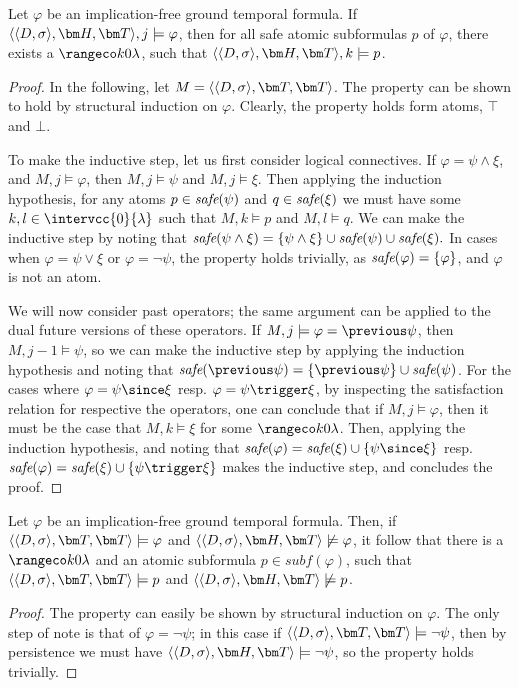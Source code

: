 \begin{lemma}\label{lemma:safe-atomic-subformula-satisfied}
  Let $\varphi$ be an implication-free ground temporal formula. If
  $\qthandt,j \models \varphi$, then for all safe atomic subformulas
  $p$ of $\varphi$, there exists a $\kinlambda$, such that
  $\qthandt,k \models p$.
\end{lemma}
\begin{proof}
  In the following, let $M=\qttandt$. The property can be shown to
  hold by structural induction on $\varphi$. Clearly, the property
  holds form atoms, $\top$ and $\bot$.

  To make the inductive step, let us first consider logical
  connectives. If $\varphi = \psi \wedge \xi$, and
  $M,j \models \varphi$, then $M,j \models \psi$ and
  $M,j \models \xi$. Then applying the induction hypothesis, for any
  atoms $p \in \textit{safe}(\psi)$ and $q \in \textit{safe}(\xi)$ we must have some
  $k,l \in \intervcc{0}{\lambda}$ such that $M,k \models p$ and
  $M,l \models q$. We can make the inductive step by noting that
  $\textit{safe}(\psi \wedge \xi) = \{ \psi \wedge \xi \} \cup \textit{safe}(\psi)
  \cup \textit{safe}(\xi).$ In cases when $\varphi = \psi \vee \xi$ or
  $\varphi = \neg \psi$, the property holds trivially, as
  $\textit{safe}(\varphi) = \{ \varphi \}$, and $\varphi$ is not an atom.

  We will now consider past operators; the same argument can be
  applied to the dual future versions of these operators. If
  $M,j \models \varphi = \previous \psi$, then $M,j-1 \models \psi$,
  so we can make the inductive step by applying the induction
  hypothesis and noting that
  $\safe{\previous \psi} = \{ \previous \psi \} \cup \safe{\psi}$. For
  the cases where $\varphi = \psi \since \xi$ resp.
  $\varphi = \psi \trigger \xi$, by inspecting the satisfaction relation for
  respective the operators, one can conclude that if
  $M,j \models \varphi$, then it must be the case that
  $M,k \models \xi$ for some $\kinlambda$. Then, applying the
  induction hypothesis, and noting that
  $\safe{\varphi} = \safe{\xi} \cup \{ \psi \since \xi \}$
  resp. $\safe{\varphi} = \safe{\xi} \cup \{ \psi \trigger \xi \}$
  makes the inductive step, and concludes the proof.
  
\end{proof}

\begin{lemma}\label{lemma:t-not-h-atomic-subformula}
  Let $\varphi$ be an implication-free ground temporal formula. Then,
  if $\qttandt \models \varphi$ and $\qthandt \not\models \varphi$, it
  follow that there is a $\kinlambda$ and an atomic subformula
  $p \in subf(\varphi)$, such that $\qttandt \models p$ and
  $\qthandt \not\models p$.
\end{lemma}
\begin{proof}
  The property can easily be shown by structural induction on
  $\varphi$. The only step of note is that of $\varphi = \neg \psi$;
  in this case if $\qttandt \models \neg \psi$, then by
  persistence we must have $\qthandt \models \neg \psi$, so the
  property holds trivially.
\end{proof}




